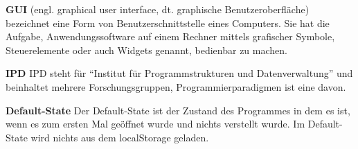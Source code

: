 \documentclass[parskip=full,11pt,twoside]{scrartcl}
\begin{document}
\textbf{GUI}
\newline
(engl. graphical user interface, dt. graphische Benutzeroberfläche) bezeichnet eine Form von Benutzerschnittstelle eines Computers. Sie hat die Aufgabe, Anwendungssoftware auf einem Rechner mittels grafischer Symbole, Steuerelemente oder auch Widgets genannt, bedienbar zu machen.

\textbf{IPD}
\newline
IPD steht für \enquote{Institut für Programmstrukturen und Datenverwaltung} und beinhaltet mehrere Forschungsgruppen, Programmierparadigmen ist eine davon.

\textbf{Default-State}
\newline
Der Default-State ist der Zustand des Programmes in dem es ist, wenn es zum ersten Mal geöffnet wurde und nichts verstellt wurde. Im Default-State wird nichts aus dem localStorage geladen.
\end{document}
